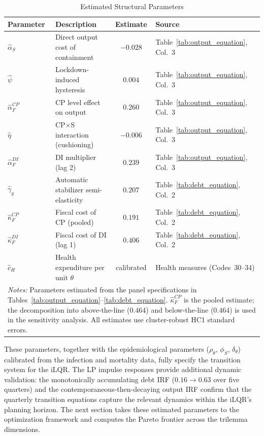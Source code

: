 \begin{table}[htbp]
\centering
\caption{Estimated Structural Parameters}
\label{tab:structural_params}
\small
\begin{tabular}{llcl}
\toprule
\textbf{Parameter} & \textbf{Description} & \textbf{Estimate} & \textbf{Source} \\
\midrule
$\hat{\alpha}_S$        & Direct output cost of containment        & $-0.028$          & Table~\ref{tab:output_equation}, Col.~3 \\
$\hat{\psi}$            & Lockdown-induced hysteresis               & $0.004$           & Table~\ref{tab:output_equation}, Col.~3 \\
$\hat{\alpha}_F^{CP}$   & CP level effect on output                & $0.260$           & Table~\ref{tab:output_equation}, Col.~3 \\
$\hat{\eta}$            & CP$\times$S interaction (cushioning)      & $-0.006$          & Table~\ref{tab:output_equation}, Col.~3 \\
$\hat{\alpha}_F^{DI}$   & DI multiplier (lag 2)                    & $0.239$           & Table~\ref{tab:output_equation}, Col.~3 \\
$\hat{\gamma}_y$        & Automatic stabilizer semi-elasticity      & $0.207$           & Table~\ref{tab:debt_equation}, Col.~2 \\
$\hat{\kappa}_F^{CP}$   & Fiscal cost of CP (pooled)               & $0.191$           & Table~\ref{tab:debt_equation}, Col.~2 \\
$\hat{\kappa}_F^{DI}$   & Fiscal cost of DI (lag 1)                & $0.406$           & Table~\ref{tab:debt_equation}, Col.~2 \\
$\hat{c}_H$             & Health expenditure per unit $\theta$     & calibrated        & Health measures (Codes~30--34) \\
\bottomrule
\multicolumn{4}{p{13cm}}{\footnotesize \textit{Notes:} Parameters estimated from the panel specifications in Tables~\ref{tab:output_equation}--\ref{tab:debt_equation}. $\hat{\kappa}_F^{CP}$ is the pooled estimate; the decomposition into above-the-line ($0.464$) and below-the-line ($0.464$) is used in the sensitivity analysis. All estimates use cluster-robust HC1 standard errors.}
\end{tabular}
\end{table}

These parameters, together with the epidemiological parameters ($\rho_\theta$, $\phi_S$, $\delta_\theta$) calibrated from the infection and mortality data, fully specify the transition system for the iLQR. The LP impulse responses provide additional dynamic validation: the monotonically accumulating debt IRF ($0.16 \to 0.63$ over five quarters) and the contemporaneous-then-decaying output IRF confirm that the quarterly transition equations capture the relevant dynamics within the iLQR's planning horizon. The next section takes these estimated parameters to the optimization framework and computes the Pareto frontier across the trilemma dimensions.
